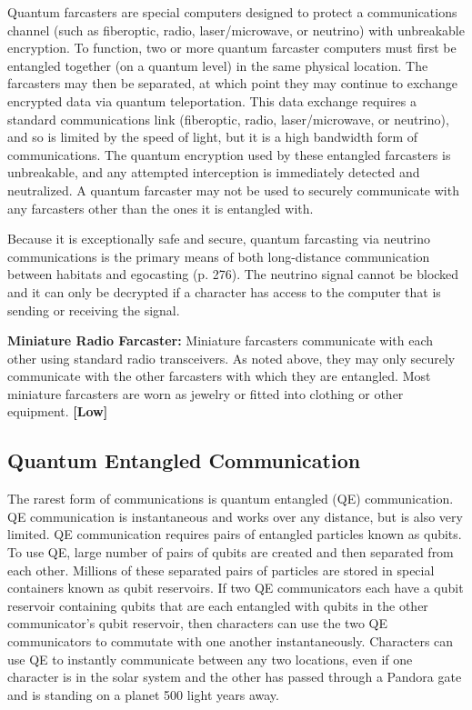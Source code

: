 Quantum farcasters are special computers designed to 
protect a communications channel (such as fiberoptic, 
radio, laser/microwave, or neutrino) with unbreakable
encryption. To function, two or more quantum
farcaster computers must first be entangled together 
(on a quantum level) in the same physical location. 
The farcasters may then be separated, at which point 
they may continue to exchange encrypted data via 
quantum teleportation. This data exchange requires 
a standard communications link (fiberoptic,  radio, 
laser/microwave, or neutrino), and so is limited by 
the speed of light, but it is a high bandwidth form 
of communications. The quantum encryption used 
by these entangled farcasters is unbreakable, and any 
attempted interception is immediately detected and 
neutralized. A quantum farcaster may not be used to 
securely communicate with any farcasters other than 
the ones it is entangled with.

Because it is exceptionally safe and secure, quantum 
farcasting via neutrino communications is the primary 
means of both long-distance communication between 
habitats and egocasting (p. 276). The neutrino signal 
cannot be blocked and it can only be decrypted if a 
character has access to the computer that is sending 
or receiving the signal.

\textbf{Miniature Radio Farcaster: }Miniature farcasters 
communicate with each other using standard radio 
transceivers. As noted above, they may only securely 
communicate with the other farcasters with which they 
are entangled. Most miniature farcasters are worn as 
jewelry or fitted into clothing or other equipment. \textbf{[Low]}

\subsection{Quantum Entangled Communication}

The rarest form of communications is quantum entangled
(QE) communication. QE communication is
instantaneous and works over any distance, but is 
also very limited. QE communication requires pairs 
of entangled particles known as qubits. To use QE, 
large number of pairs of qubits are created and then 
separated from each other. Millions of these separated
pairs of particles are stored in special containers
known as qubit reservoirs. If two QE communicators 
each have a qubit reservoir containing qubits that are 
each entangled with qubits in the other communicator's
qubit reservoir, then characters can use the two
QE communicators to commutate with one another 
instantaneously. Characters can use QE to instantly 
communicate between any two locations, even if one 
character is in the solar system and the other has 
passed through a Pandora gate and is standing on a 
planet 500 light years away.

